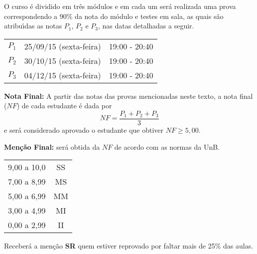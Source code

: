 \documentclass[12pt]{article}
\begin{document}
 O curso \'{e} dividido em tr\^{e}s
m\'{o}dulos e em cada um ser{\'a} realizada uma prova correspondendo a 90\% da nota do módulo e testes em sala, as quais s\~{a}o atribu\'{\i}das as notas $P_1$, $P_2$ e $P_3$, nas datas detalhadas a seguir.

\begin{center}
    \begin{tabular}{c|c|c}
        \hline\hline
        \hspace{1cm}{\bf Prova}\hspace{1cm} & \hspace{3cm}{\bf Data}\hspace{3cm} & \hspace{1.7cm}{\bf Hor\'{a}rio}\hspace{1.7cm} \\
        \hline\hline
        $P_1$ & 25/09/15 (sexta-feira) \phantom{x} & 19:00 - 20:40 \\
        \hline
        $P_2$ & 30/10/15 (sexta-feira) \phantom{x} & 19:00 - 20:40 \\
        \hline
        $P_3$ & 04/12/15 (sexta-feira) \phantom{x} & 19:00 - 20:40 \\
        \hline\hline
    \end{tabular}
\end{center}

{\bf \noindent Nota Final:} A partir das notas das provas mencionadas neste texto, a nota final ($NF$) de cada estudante \'{e} dada
por
\vspace{-0.15cm}
\[
NF = \frac{ P_1 + P_2 + P_3}{3}
\]
e ser\'{a} considerado aprovado o estudante que obtiver $NF \geq 5,00$.

{\bf \noindent Men\c{c}\~{a}o Final:} ser\'{a} obtida da $NF$ de
acordo com as normas da UnB.
\begin{center}
    \begin{tabular}{c|c}
        \hline\hline
        \hspace{1cm}{Nota}\hspace{1cm} & \hspace{0.25cm}{Men\c{c}\~{a}o}\hspace{0.25cm}\\
        \hline\hline
        9,00 a 10,0 & SS \\
        \hline
        7,00 a 8,99 & MS \\
        \hline
        5,00 a 6,99 & MM \\
        \hline
        3,00 a 4,99 & MI \\
        \hline
        0,00 a 2,99  & II \\
        \hline\hline
    \end{tabular}
\end{center}
Receber{\'a} a men{\c c}{\~a}o {\bf SR} quem estiver reprovado por faltar mais de 25\%
das aulas.
\end{document}
